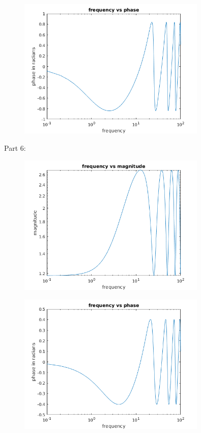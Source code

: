 \documentclass{article}
\begin{document}
\begin{figure}[H]
    \centering
    \includegraphics[width=0.8\textwidth]{PR3_5phase.png}
\end{figure}
Part 6:
\begin{figure}[H]
    \centering
    \includegraphics[width=0.8\textwidth]{PR3_6amp.png}
\end{figure}
\begin{figure}[H]
    \centering
    \includegraphics[width=0.8\textwidth]{PR3_6phase.png}
\end{figure}
\end{document}
